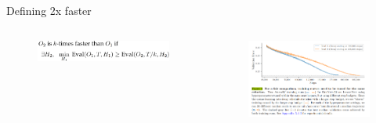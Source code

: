 \documentclass[
	11pt, %
	aspectratio=169, %
]{beamer}
\begin{document}
\begin{frame}{Defining 2x faster }
\begin{columns}[c] %
		\begin{column}{0.45\textwidth} %
			\begin{figure}
				\includegraphics[width=8cm]{figures/2xfaster.png}
			\end{figure}
		\end{column}
		\begin{column}{0.55\textwidth} %
        	\begin{figure}
        	    \centering
                \includegraphics[width=7.5cm]{figures/figure4_dahl_et_al.PNG}
        	\end{figure}
		\end{column}
	\end{columns}
\end{frame}


\end{document}
